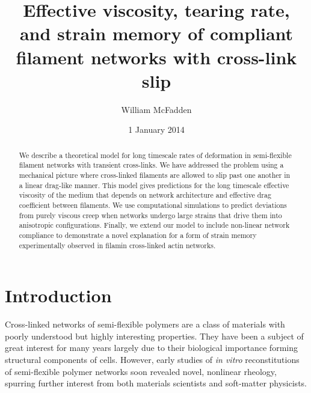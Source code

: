 \documentclass[pre,reprint]{revtex4-1}
\begin{document}
\title{Effective viscosity, tearing rate, and strain memory of compliant filament networks with cross-link slip}
\author{William McFadden}

\date{1 January 2014}

\begin{abstract}
We describe a theoretical model for long timescale rates of deformation in semi-flexible filament networks with transient cross-links.  We have addressed the problem using a mechanical picture where cross-linked filaments are allowed to slip past one another in a linear drag-like manner.  This model gives predictions for the long timescale effective viscosity of the medium that depends on network architecture and effective drag coefficient between filaments.  We use computational simulations to predict deviations from purely viscous creep when networks undergo large strains that drive them into anisotropic configurations.  Finally, we extend our model to include non-linear network compliance to demonstrate a novel explanation for a form of strain memory experimentally observed in filamin cross-linked actin networks.
\end{abstract}

\maketitle


\tableofcontents


















\section{Introduction}

Cross-linked networks of semi-flexible polymers are a class of materials with poorly understood but highly interesting properties.  They have been a subject of great interest for many years largely due to their biological importance forming structural components of cells\cite{cellmech_review1,cellmech_review2}.  However, early studies of {\em in vitro} reconstitutions of semi-flexible polymer networks soon revealed novel, nonlinear rheology, spurring further interest from both materials scientists and soft-matter physicists\cite{megareview}.  
\end{document}

